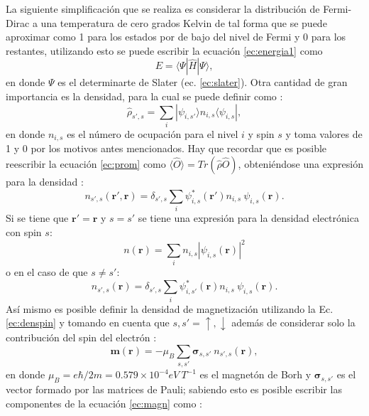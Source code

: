 	La siguiente simplificaci\'on que se realiza es considerar la distribuci\'on de Fermi-Dirac a una temperatura de cero grados Kelvin de tal forma que se puede aproximar como 1 para los estados por de bajo del nivel de Fermi y 0 para los restantes, utilizando esto se puede escribir la ecuaci\'on \ref{ec:energia1} como
	\begin{equation}
	E= \langle \Psi | \hat{H} | \Psi \rangle \label{ec:energia},
	\end{equation}
	en donde $\Psi$ es el determinarte de Slater (ec. \ref{ec:slater}).
	\newline
	Otra cantidad de gran importancia es la densidad, para la cual se puede definir como \cite{Martin-2004}:
	\begin{equation}
	\hat{\rho}_{s ', s}= \sum_{i} | \psi_{i,s '} \rangle n_{i,s} \langle \psi_{i,s} | \label{ec:densidad} ,
	\end{equation}
	en donde $ n_{i,s} $ es el n\'umero de ocupaci\'on para el nivel $i$ y spin $s$ y toma valores de 1 y 0 por los motivos antes mencionados. Hay que recordar que es posible reescribir la ecuaci\'on \ref{ec:prom} como $\langle \hat{O} \rangle = Tr (\hat{\rho} \hat{O} ) $, obteniéndose  una expresi\'on para la densidad \cite{Martin-2004}:
	\begin{equation}
	n_{s ', s} (\pmb{r ', r} ) = \delta_{s',s} \sum_{i} \psi_{i,s} ^{ *} (\pmb{r'}) n_{i,s} ~\psi_{i,s } (\pmb{r}) .  \label{ec:densidadr}
	\end{equation}
	Si se tiene que $\pmb{r'} = \pmb{r}  $ y $s = s '  $ se tiene una expresi\'on para la densidad electr\'onica con spin $s$:
	\begin{equation}
	n(\pmb{r})= \sum_{i} n_{i,s} | \psi_{i,s} (\pmb{r}) |^2 \label{ec:densTot}
	\end{equation}
	o en el caso de que $s \not = s '  $:
	\begin{equation}
	n_{s ', s }(\pmb{r})= \delta_{s',s} \sum_{i} \psi_{i,s '}^ {*} (\pmb{r}) n_{i,s}~ \psi_{i,s } (\pmb{r}). \label{ec:denspin}
	\end{equation}
	As\'i mismo es posible definir la densidad de magnetizaci\'on utilizando la Ec. \ref{ec:denspin} y tomando en cuenta que $s, s ' = \uparrow, \downarrow $ adem\'as de considerar solo la contribuci\'on del spin del electr\'on \cite{MB-2015}:
	\begin{equation}
	\pmb{m} (\pmb{r}) = - \mu_{B} \sum_{s,s '} \pmb{\sigma}_{s,s'}~ n_{s ', s }(\pmb{r}) , \label{ec:magn}
	\end{equation}
	en donde $\mu_B= e \hbar/2 m = 0.579 \times 10^{-4} eV~ T^{-1}$ es el magnet\'on de Borh y $ \pmb{\sigma}_{s,s'}$ es el vector formado por las matrices de Pauli; sabiendo esto es posible escribir las componentes de la ecuaci\'on \ref{ec:magn} como \cite{MB-2015}:
